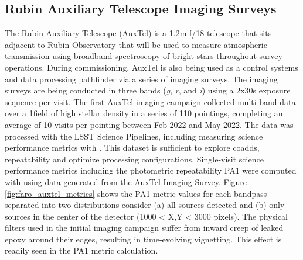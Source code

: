 \subsection{Rubin Auxiliary Telescope Imaging Surveys} \label{ssec:auxtel}

The Rubin Auxiliary Telescope\cite{10.1117/12.2561112} (AuxTel) is a 1.2m f/18 telescope that sits adjacent to Rubin Observatory that will be used to measure atmospheric transmission using broadband spectroscopy of bright stars throughout survey operations. 
During commissioning, AuxTel is also being used as a control systems and data processing pathfinder via a series of imaging surveys. 
The imaging surveys are being conducted in three bands (\emph{g}, \emph{r}, and \emph{i}) using a 2x30s exposure sequence per visit.
The first AuxTel imaging campaign collected multi-band data over a 1\degsq field of high stellar density in a series of 110 pointings, completing an average of 10 visits per pointing between Feb 2022 and May 2022. 
The data was processed with the LSST Science Pipelines, including measuring science performance metrics with \faro. 
This dataset is sufficient to explore coadds, repeatability and optimize processing configurations.
Single-visit science performance metrics including the photometric repeatability PA1 were computed with \faro using data generated from the AuxTel Imaging Survey. 
Figure \ref{fig:faro_auxtel_metrics} shows the PA1 metric values for each bandpass separated into two distributions consider (a) all sources detected and (b) only sources in the center of the detector (1000 < X,Y < 3000 pixels). 
The physical filters used in the initial imaging campaign suffer from inward creep of leaked epoxy around their edges, resulting in time-evolving vignetting. 
This effect is readily seen in the PA1 metric calculation.  
